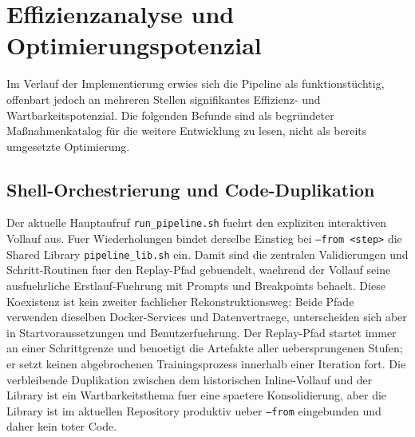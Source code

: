 \documentclass[12pt,a4paper]{article}
\begin{document}
\section{Effizienzanalyse und Optimierungspotenzial}

Im Verlauf der Implementierung erwies sich die Pipeline als funktionstüchtig,
offenbart jedoch an mehreren Stellen signifikantes Effizienz- und
Wartbarkeitspotenzial. Die folgenden Befunde sind als begründeter
Maßnahmenkatalog für die weitere Entwicklung zu lesen, nicht als bereits
umgesetzte Optimierung.

\subsection{Shell-Orchestrierung und Code-Duplikation}
Der aktuelle Hauptaufruf \texttt{run\_pipeline.sh} fuehrt den expliziten
interaktiven Vollauf aus. Fuer Wiederholungen bindet derselbe Einstieg bei
\texttt{--from <step>} die Shared Library \texttt{pipeline\_lib.sh} ein.
Damit sind die zentralen Validierungen und Schritt-Routinen fuer den
Replay-Pfad gebuendelt, waehrend der Vollauf seine ausfuehrliche
Erstlauf-Fuehrung mit Prompts und Breakpoints behaelt. Diese Koexistenz ist
kein zweiter fachlicher Rekonstruktionsweg: Beide Pfade verwenden dieselben
Docker-Services und Datenvertraege, unterscheiden sich aber in
Startvoraussetzungen und Benutzerfuehrung. Der Replay-Pfad startet immer an
einer Schrittgrenze und benoetigt die Artefakte aller uebersprungenen Stufen;
er setzt keinen abgebrochenen Trainingsprozess innerhalb einer Iteration fort.
Die verbleibende Duplikation zwischen dem historischen Inline-Vollauf und der
Library ist ein Wartbarkeitsthema fuer eine spaetere Konsolidierung, aber die
Library ist im aktuellen Repository produktiv ueber \texttt{--from} eingebunden
und daher kein toter Code.
\end{document}
